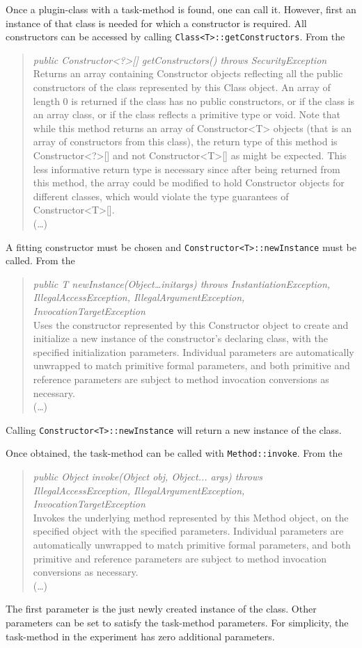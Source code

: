 Once a plugin-class with a task-method is found, one can call it.
However, first an instance of that class is needed for which a constructor is required.
All constructors can be accessed by calling \lstinline{Class<T>::getConstructors}.
From the \textcite{javadoc:class}
\begin{quote}
    \textit{public Constructor<?>[] getConstructors() throws SecurityException}\\
    Returns an array containing Constructor objects reflecting all the public constructors of the class represented by this Class object. An array of length 0 is returned if the class has no public constructors, or if the class is an array class, or if the class reflects a primitive type or void. Note that while this method returns an array of Constructor<T> objects (that is an array of constructors from this class), the return type of this method is Constructor<?>[] and not Constructor<T>[] as might be expected. This less informative return type is necessary since after being returned from this method, the array could be modified to hold Constructor objects for different classes, which would violate the type guarantees of Constructor<T>[].\\
    (\dots)
\end{quote}
A fitting constructor must be chosen and \lstinline{Constructor<T>::newInstance} must be called.
From the \textcite{javadoc:constructor}
\begin{quote}
    \textit{public T newInstance(Object\dots initargs) throws InstantiationException, IllegalAccessException, IllegalArgumentException, InvocationTargetException}\\
    Uses the constructor represented by this Constructor object to create and initialize a new instance of the constructor's declaring class, with the specified initialization parameters. Individual parameters are automatically unwrapped to match primitive formal parameters, and both primitive and reference parameters are subject to method invocation conversions as necessary.\\
    (\dots)
\end{quote}
Calling \lstinline{Constructor<T>::newInstance} will return a new instance of the class.

Once obtained, the task-method can be called with \lstinline{Method::invoke}.
From the \textcite{javadoc:method}
\begin{quote}
    \textit{public Object invoke(Object obj, Object... args) throws IllegalAccessException, IllegalArgumentException, InvocationTargetException}\\
    Invokes the underlying method represented by this Method object, on the specified object with the specified parameters. Individual parameters are automatically unwrapped to match primitive formal parameters, and both primitive and reference parameters are subject to method invocation conversions as necessary.\\
    (\dots)
\end{quote}
The first parameter is the just newly created instance of the class.
Other parameters can be set to satisfy the task-method parameters.
For simplicity, the task-method in the experiment has zero additional parameters.